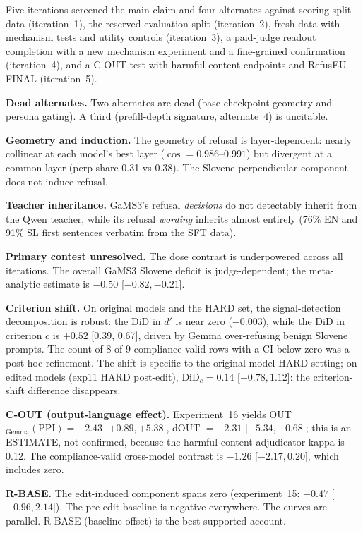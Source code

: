 \documentclass[11pt,letterpaper]{article}
\begin{document}
Five iterations screened the main claim and four alternates against scoring-split data (iteration~1), the reserved evaluation split (iteration~2), fresh data with mechanism tests and utility controls (iteration~3), a paid-judge readout completion with a new mechanism experiment and a fine-grained confirmation (iteration~4), and a C-OUT test with harmful-content endpoints and RefusEU FINAL (iteration~5).

\textbf{Dead alternates.} Two alternates are dead (base-checkpoint geometry and persona gating). A third (prefill-depth signature, alternate~4) is uncitable.

\textbf{Geometry and induction.} The geometry of refusal is layer-dependent: nearly collinear at each model's best layer ($\cos = 0.986$--$0.991$) but divergent at a common layer (perp share 0.31 vs 0.38). The Slovene-perpendicular component does not induce refusal.

\textbf{Teacher inheritance.} GaMS3's refusal \emph{decisions} do not detectably inherit from the Qwen teacher, while its refusal \emph{wording} inherits almost entirely (76\% EN and 91\% SL first sentences verbatim from the SFT data).

\textbf{Primary contest unresolved.} The dose contrast is underpowered across all iterations. The overall GaMS3 Slovene deficit is judge-dependent; the meta-analytic estimate is $-0.50$ [$-0.82, -0.21$\hspace{0pt}].

\textbf{Criterion shift.} On original models and the HARD set, the signal-detection decomposition is robust: the DiD in $d'$ is near zero ($-0.003$), while the DiD in criterion $c$ is $+0.52$ [0.39, 0.67], driven by Gemma over-refusing benign Slovene prompts. The count of 8 of 9 compliance-valid rows with a CI below zero was a post-hoc refinement. The shift is specific to the original-model HARD setting; on edited models (exp11 HARD post-edit), DiD$_c = 0.14$ [$-0.78, 1.12$]: the criterion-shift difference disappears.

\textbf{C-OUT (output-language effect).} Experiment~16 yields OUT$_{\text{Gemma}}(\text{PPI}) = +2.43$ [$+0.89, +5.38$], dOUT $= -2.31$ [$-5.34, -0.68$]; this is an ESTIMATE, not confirmed, because the harmful-content adjudicator kappa is 0.12. The compliance-valid cross-model contrast is $-1.26$ [$-2.17, 0.20$], which includes zero.

\textbf{R-BASE.} The edit-induced component spans zero (experiment~15: $+0.47$ [$-0.96, 2.14$]). The pre-edit baseline is negative everywhere. The curves are parallel. R-BASE (baseline offset) is the best-supported account.
\end{document}
